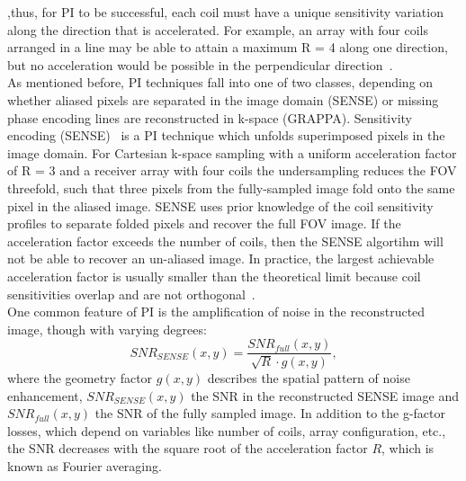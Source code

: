 \documentclass[english,version-2022-01]{uzl-thesis} %
\begin{document}
,thus, for PI to be successful, each coil must have a unique sensitivity variation along the direction that is accelerated. For example, an array with four coils arranged in a line may be able to attain a maximum R = 4 along one direction, but no acceleration would be possible in the perpendicular direction~\cite{AdvancesPI}.\\
As mentioned before, PI techniques fall into one of two classes, depending on whether aliased pixels are separated in the image domain (SENSE) or missing phase encoding lines are reconstructed in k-space (GRAPPA). Sensitivity encoding (SENSE)~\cite{SENSE1} is a PI technique which unfolds superimposed pixels in the image domain. For Cartesian k-space sampling with a uniform acceleration factor of R = 3 and a receiver array with four coils the undersampling reduces the FOV threefold, such that three pixels from the fully-sampled image fold onto the same pixel in the aliased image. SENSE uses prior knowledge of the coil sensitivity profiles to separate folded pixels and recover the full FOV image. 
If the acceleration factor exceeds the number of coils, then the
SENSE 
algortihm will not be able to recover an un-aliased image.
In practice, the largest achievable acceleration factor is usually smaller than the theoretical limit because coil sensitivities overlap and are not orthogonal~\cite{AdvancesPI}.\\
One common feature of PI is the amplification of noise in the reconstructed image, though with varying degrees:
\begin{equation} \label{eq:SNR-SENSE}
	SNR_{SENSE}(x,y) = \frac{SNR_{full}(x,y)}{\sqrt{R} \cdot g(x,y)},
\end{equation}
where the geometry factor $g(x,y)$ describes the spatial pattern of noise enhancement, $SNR_{SENSE}(x,y)$ the SNR in the reconstructed SENSE image and $SNR_{full}(x,y)$ the SNR of the fully sampled image. In addition to the g-factor losses, which depend on variables like number of coils, array configuration, etc., the SNR decreases with the square root of the acceleration factor $R$, which is known as Fourier averaging.\\
\end{document}
